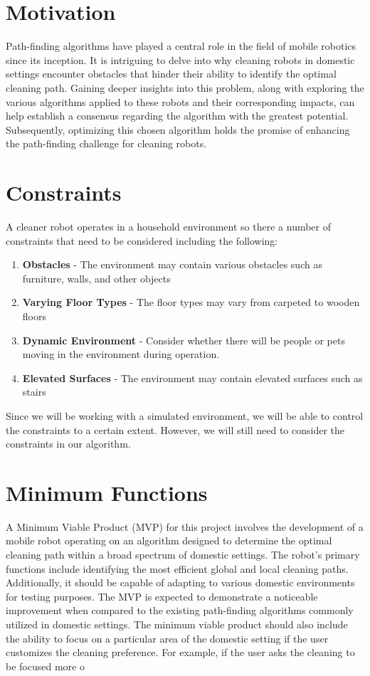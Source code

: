 \documentclass[12pt]{article}
\begin{document}
\section{Motivation}
Path-finding algorithms have played a central role in the field of mobile
robotics since its inception. It is intriguing to delve into why cleaning
robots in domestic settings encounter obstacles that hinder their ability to
identify the optimal cleaning path. Gaining deeper insights into this problem,
along with exploring the various algorithms applied to these robots and their
corresponding impacts, can help establish a consensus regarding the algorithm
with the greatest potential. Subsequently, optimizing this chosen algorithm
holds the promise of enhancing the path-finding challenge for cleaning robots.

\section{Constraints}
A cleaner robot operates in a household environment so there a number of
constraints that need to be considered including the following:

\begin{enumerate}
    \item \textbf{Obstacles} - The environment may contain various obstacles such as furniture, walls, and other objects
    \item \textbf{Varying Floor Types} - The floor types may vary from carpeted to wooden floors
    \item \textbf{Dynamic Environment} - Consider whether there will be people or pets moving in the environment during operation.
    \item \textbf{Elevated Surfaces} - The environment may contain elevated surfaces such as stairs
\end{enumerate}

Since we will be working with a simulated environment, we will be able to
control the constraints to a certain extent. However, we will still need to
consider the constraints in our algorithm.

\section{Minimum Functions}
A Minimum Viable Product (MVP) for this project involves the development of a
mobile robot operating on an algorithm designed to determine the optimal
cleaning path within a broad spectrum of domestic settings. The robot's primary
functions include identifying the most efficient global and local cleaning
paths. Additionally, it should be capable of adapting to various domestic
environments for testing purposes. The MVP is expected to demonstrate a
noticeable improvement when compared to the existing path-finding algorithms
commonly utilized in domestic settings. \newline \newline The minimum viable
product should also include the ability to focus on a particular area of the
domestic setting if the user customizes the cleaning preference. For example,
if the user asks the cleaning to be focused more o
\end{document}
